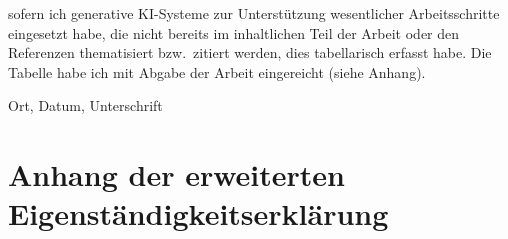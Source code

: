 \vspace{0.5cm}

\noindent\ankreuz\quad sofern ich generative KI-Systeme zur Unterstützung
wesentlicher Arbeitsschritte eingesetzt habe, die nicht bereits im
inhaltlichen Teil der Arbeit oder den Referenzen thematisiert bzw.\ zitiert
werden, dies tabellarisch erfasst habe. Die Tabelle habe ich mit Abgabe der
Arbeit eingereicht (siehe Anhang).

\vspace{1cm}
\noindent Ort, Datum, Unterschrift

\newpage


\section*{Anhang der erweiterten Eigenständigkeitserklärung}


